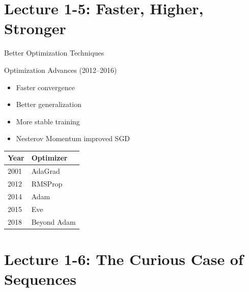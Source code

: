 \documentclass{beamer}
\begin{document}
\section{Lecture 1-5: Faster, Higher, Stronger}

\begin{frame}{Better Optimization Techniques}

\begin{block}{Optimization Advances (2012--2016)}
\begin{itemize}
\item Faster convergence
\item Better generalization
\item More stable training
\item Nesterov Momentum improved SGD
\end{itemize}
\end{block}

\vspace{0.2cm}

\begin{center}

\begin{tabular}{ll}
\toprule
\textbf{Year} & \textbf{Optimizer} \\
\midrule
2001 & AdaGrad \\
2012 & RMSProp \\
2014 & Adam \\
2015 & Eve \\
2018 & Beyond Adam \\
\bottomrule
\end{tabular}

\end{center}

\end{frame}

\section{Lecture 1-6: The Curious Case of Sequences}
\end{document}
